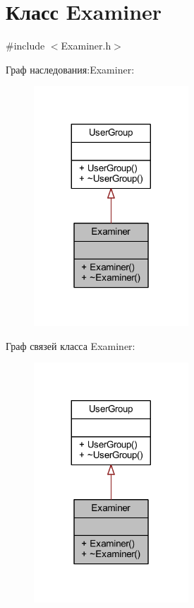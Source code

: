 \hypertarget{class_examiner}{}\section{Класс Examiner}
\label{class_examiner}


{\ttfamily \#include $<$Examiner.\+h$>$}



Граф наследования\+:Examiner\+:\nopagebreak
\begin{figure}[H]
\begin{center}
\leavevmode
\includegraphics[width=164pt]{d8/dd3/class_examiner__inherit__graph}
\end{center}
\end{figure}


Граф связей класса Examiner\+:\nopagebreak
\begin{figure}[H]
\begin{center}
\leavevmode
\includegraphics[width=164pt]{d6/d2b/class_examiner__coll__graph}
\end{center}
\end{figure}
